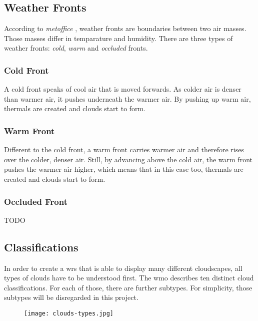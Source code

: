 
\subsection{Weather Fronts}
According to \emph{metoffice} \cite{metoffice:weatherfronts}, weather fronts are boundaries between two air masses. Those masses differ in temparature and humidity.
There are three types of weather fronts: \emph{cold}, \emph{warm} and \emph{occluded} fronts.

\subsubsection{Cold Front}
A cold front speaks of cool air that is moved forwards. As colder air is denser than warmer air, it pushes underneath the warmer air.
By pushing up warm air, \gls{thermal}s are created and clouds start to form.

\subsubsection{Warm Front}
Different to the cold front, a warm front carries warmer air and therefore rises over the colder, denser air.
Still, by advancing above the cold air, the warm front pushes the warmer air higher, which means that in this case too, \gls{thermal}s are created and clouds start to form.

\subsubsection{Occluded Front}
\color{orange}
TODO
\color{black}

\subsection{Classifications}
In order to create a \gls{wrs} that is able to display many different cloudscapes, all types of clouds have to be understood first.
The \gls{wmo} describes ten distinct cloud classifications. For each of those, there are further subtypes. For simplicity, those subtypes will be disregarded in this project.

\begin{figure}[H]
    \texttt{[image: clouds-types.jpg]}
    \label{img:ui:mockup:live}
\end{figure}

